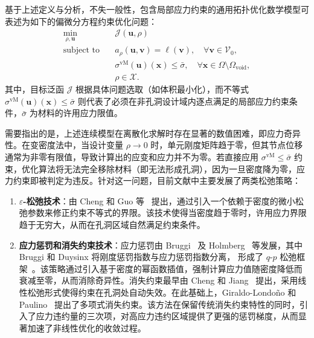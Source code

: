 基于上述定义与分析，不失一般性，包含局部应力约束的通用拓扑优化数学模型可表述为如下的偏微分方程约束优化问题：
\begin{equation} \label{eq:ch6_stress_constrained_problem}
	\begin{aligned}
		\min_{\rho,\boldsymbol{u}}\quad&\mathcal{J}(\boldsymbol{u}, \rho)\\
		\text{subject~to}\quad&
		a_\rho(\boldsymbol{u},\boldsymbol{v}) = \ell(\boldsymbol{v}),\quad\forall\boldsymbol{v}\in\mathcal{V}_0,\\
		&\sigma^{\text{vM}}(\boldsymbol{u})(\boldsymbol{x}) \le \bar{\sigma}, \quad \forall \boldsymbol{x} \in \Omega \setminus \Omega_{\text{void}},\\
		&\rho\in\mathcal{X}.
	\end{aligned}
\end{equation}
其中，目标泛函 $\mathcal{J}$ 根据具体问题选取（如体积最小化），而不等式 $\sigma^{\text{vM}}(\boldsymbol{u})(\boldsymbol{x}) \le \bar{\sigma}$ 则代表了必须在非孔洞设计域内逐点满足的局部应力约束条件，$\bar{\sigma}$ 为材料的许用应力限值。

需要指出的是，上述连续模型在离散化求解时存在显著的数值困难，即应力奇异性。在变密度法中，当设计变量 $\rho \to 0$ 时，单元刚度矩阵趋于零，但其节点位移通常为非零有限值，导致计算出的应变和应力并不为零。若直接应用 $\sigma^{\text{vM}} \le \bar{\sigma}$ 约束，优化算法将无法完全移除材料（即无法形成孔洞），因为一旦密度降为零，应力约束即被判定为违反。针对这一问题，目前文献中主要发展了两类松弛策略：

\begin{enumerate}
	\item \textbf{$\varepsilon$-松弛技术}：由 Cheng 和 Guo 等~\cite{chengErelaxedApproachStructural1997} 提出，通过引入一个依赖于密度的微小松弛参数来修正约束不等式的界限。该技术使得当密度趋于零时，许用应力界限趋于无穷大，从而在孔洞区域自然满足约束条件。
	
	\item \textbf{应力惩罚和消失约束技术}：应力惩罚由 Bruggi~\cite{bruggiAlternativeApproachStress2008a} 及 Holmberg~\cite{holmbergStressConstrainedTopology2013a} 等发展，其中 Bruggi 和 Duysinx 将刚度惩罚指数与应力惩罚指数分离，
	形成了 $q\text{-}p$ 松弛框架~\cite{bruggiTopologyOptimizationMinimum2012}。该策略通过引入基于密度的幂函数插值，强制计算应力值随密度降低而衰减至零，从而消除奇异性。消失约束最早由 Cheng 和 Jiang~\cite{chengStudyTopologyOptimization1992} 提出，采用线性松弛形式使得约束在孔洞处自动失效。在此基础上，Giraldo-Londoño 和 Paulino~\cite{giraldo-londonoUnifiedApproachTopology2020} 提出了多项式消失约束。该方法在保留传统消失约束特性的同时，引入了应力违约量的三次项，对高应力违约区域提供了更强的惩罚梯度，从而显著加速了非线性优化的收敛过程。
\end{enumerate}

